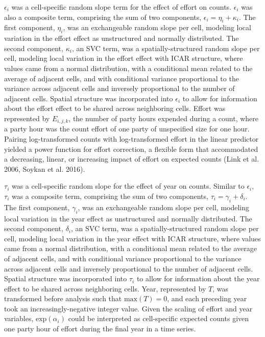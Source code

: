 \documentclass[]{article}
\begin{document}
$\epsilon_i$ was a cell-specific random slope term for the effect of effort on counts. $\epsilon_i$ was also a composite term, comprising the sum of two components, $\epsilon_i = \eta_i + \kappa_i$. The first component, $\eta_i$, was an exchangeable random slope per cell, modeling local variation in the effort effect as unstructured and normally distributed. The second component, $\kappa_i$, an SVC term, was a spatially-structured random slope per cell, modeling local variation in the effort effect with ICAR structure, where values came from a normal distribution, with a conditional mean related to the average of adjacent cells, and with conditional variance proportional to the variance across adjacent cells and inversely proportional to the number of adjacent cells. Spatial structure was incorporated into $\epsilon_i$ to allow for information about the effort effect to be shared across neighboring cells. Effort was represented by $E_{i,j,k}$, the number of party hours expended during a count, where a party hour was the count effort of one party of unspecified size for one hour. Pairing log-transformed counts with log-transformed effort in the linear predictor yielded a power function for effort correction, a flexible form that accommodated a decreasing, linear, or increasing impact of effort on expected counts (Link et al. 2006, Soykan et al. 2016).  

$\tau_i$ was a cell-specific random slope for the effect of year on counts. Similar to $\epsilon_i$, $\tau_i$ was a composite term, comprising the sum of two components, $\tau_i = \gamma_i + \delta_i$. The first component, $\gamma_i$, was an exchangeable random slope per cell, modeling local variation in the year effect as unstructured and normally distributed. The second component, $\delta_i$, an SVC term, was a spatially-structured random slope per cell, modeling local variation in the year effect with ICAR structure, where values came from a normal distribution, with a conditional mean related to the average of adjacent cells, and with conditional variance proportional to the variance across adjacent cells and inversely proportional to the number of adjacent cells. Spatial structure was incorporated into $\tau_i$ to allow for information about the year effect to be shared across neighboring cells. Year, represented by $T$, was transformed before analysis such that $\text{max}(T) = 0$, and each preceding year took an increasingly-negative integer value. Given the scaling of effort and year variables, $\text{exp}(\alpha_i)$ could be interpreted as cell-specific expected counts given one party hour of effort during the final year in a time series.
\end{document}
